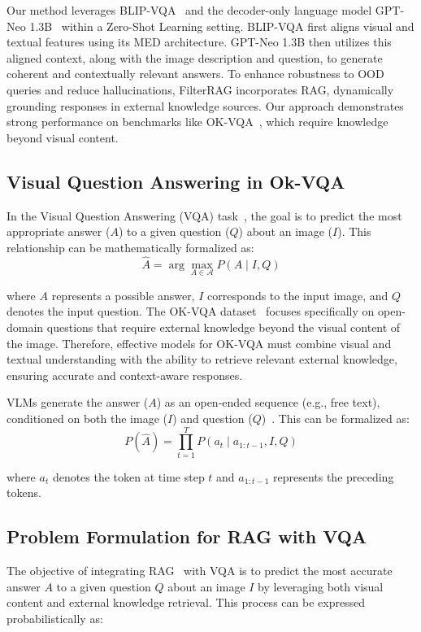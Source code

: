 Our method leverages BLIP-VQA~\cite{li2022blip} and the decoder-only language model GPT-Neo 1.3B~\cite{gpt-neo} within a Zero-Shot Learning setting. BLIP-VQA first aligns visual and textual features using its MED architecture. GPT-Neo 1.3B then utilizes this aligned context, along with the image description and question, to generate coherent and contextually relevant answers. To enhance robustness to OOD queries and reduce hallucinations, FilterRAG incorporates RAG, dynamically grounding responses in external knowledge sources. Our approach demonstrates strong performance on benchmarks like OK-VQA~\cite{marino2019ok}, which require knowledge beyond visual content.

\subsection{Visual Question Answering in Ok-VQA}
In the Visual Question Answering (VQA) task~\cite{antol2015vqa, marino2019ok, zhang2016yin, goyal2017making}, the goal is to predict the most appropriate answer ($A$) to a given question ($Q$) about an image ($I$). This relationship can be mathematically formalized as:
\begin{equation}
\hat{A} = \arg\max_{A \in \mathcal{A}} P(A \mid I, Q)
\end{equation}

where $A$ represents a possible answer, $I$ corresponds to the input image, and $Q$ denotes the input question. The OK-VQA dataset~\cite{marino2019ok} focuses specifically on open-domain questions that require external knowledge beyond the visual content of the image. Therefore, effective models for OK-VQA must combine visual and textual understanding with the ability to retrieve relevant external knowledge, ensuring accurate and context-aware responses.

VLMs generate the answer ($A$) as an open-ended sequence (e.g., free text), conditioned on both the image ($I$) and question ($Q$)~\cite{li2024configure}.  This can be formalized as:
\begin{equation}
P(\hat{A}) = \prod_{t=1}^{T} P(a_t \mid a_{1:t-1}, I, Q)
\end{equation}

where \( a_t \) denotes the token at time step \( t \) and \( a_{1:t-1} \) represents the preceding tokens. 

\subsection{Problem Formulation for RAG with VQA}
The objective of integrating RAG~\cite{lewis2020retrieval, ram2023context, karpukhin2020dense} with VQA is to predict the most accurate answer $A$ to a given question $Q$ about an image $I$ by leveraging both visual content and external knowledge retrieval. This process can be expressed probabilistically as:

